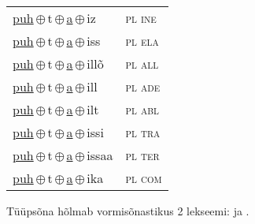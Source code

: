 \begin{minipage}{\textwidth}
\begin{sideways}
\begin{tabular}{l l}
\underline{puh}\,$\oplus$\,t\,$\oplus$\,\underline{a}\,$\oplus$\,iz & \textsc{ pl ine } \\
\underline{puh}\,$\oplus$\,t\,$\oplus$\,\underline{a}\,$\oplus$\,iss & \textsc{ pl ela } \\
\underline{puh}\,$\oplus$\,t\,$\oplus$\,\underline{a}\,$\oplus$\,illõ & \textsc{ pl all } \\
\underline{puh}\,$\oplus$\,t\,$\oplus$\,\underline{a}\,$\oplus$\,ill & \textsc{ pl ade } \\
\underline{puh}\,$\oplus$\,t\,$\oplus$\,\underline{a}\,$\oplus$\,ilt & \textsc{ pl abl } \\
\underline{puh}\,$\oplus$\,t\,$\oplus$\,\underline{a}\,$\oplus$\,issi & \textsc{ pl tra } \\
\underline{puh}\,$\oplus$\,t\,$\oplus$\,\underline{a}\,$\oplus$\,issaa & \textsc{ pl ter } \\
\underline{puh}\,$\oplus$\,t\,$\oplus$\,\underline{a}\,$\oplus$\,ika & \textsc{ pl com } \\
\end{tabular}
\end{sideways}
\label{tab:tüüpsõnamall-puhaz}

\end{minipage}

 
\vspace{1em}
\noindent Tüüpsõna hõlmab vormisõnastikus 2 lekseemi:  ja .
